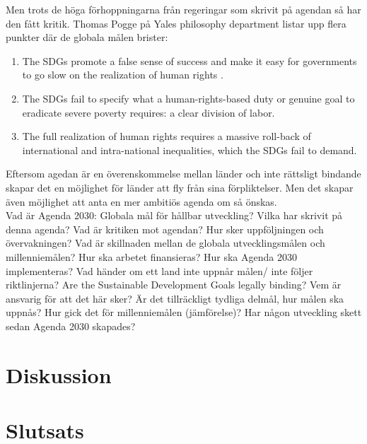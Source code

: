 \documentclass{report}
\begin{document}
Men trots de höga förhoppningarna från regeringar som skrivit på agendan så har den fått kritik. Thomas Pogge \cite{critique} på Yales philosophy department listar upp flera punkter där de globala målen brister: 

\begin{enumerate}
\item The SDGs promote a false sense of success and make it easy for governments to go
slow on the realization of human rights .
\item The SDGs fail to specify what a human-rights-based duty or genuine goal to eradicate severe poverty requires: a clear division of labor.
\item The full realization of human rights requires a massive roll-back of international and intra-national inequalities, which the SDGs fail to demand.
\end{enumerate}




Eftersom agedan är en överenskommelse mellan länder och inte rättsligt bindande skapar det en möjlighet för länder att fly från sina förpliktelser. Men det skapar även möjlighet att anta en mer ambitiös agenda om så önskas. \cite{critique}\\


Vad är Agenda 2030: Globala mål för hållbar utveckling? 
Vilka har skrivit på denna agenda?
Vad är kritiken mot agendan? 
Hur sker uppföljningen och övervakningen?
Vad är skillnaden mellan de globala utvecklingsmålen och millenniemålen?
Hur ska arbetet finansieras?
Hur ska Agenda 2030 implementeras? 
Vad händer om ett land inte uppnår målen/ inte följer riktlinjerna? 
Are the Sustainable Development Goals legally binding? 
Vem är ansvarig för att det här sker?
Är det tillräckligt tydliga delmål, hur målen ska uppnås?
Hur gick det för millenniemålen (jämförelse)? 
Har någon utveckling skett sedan Agenda 2030 skapades?



\newpage
\section{Diskussion}

\newpage
\section{Slutsats}

 
\end{document}
